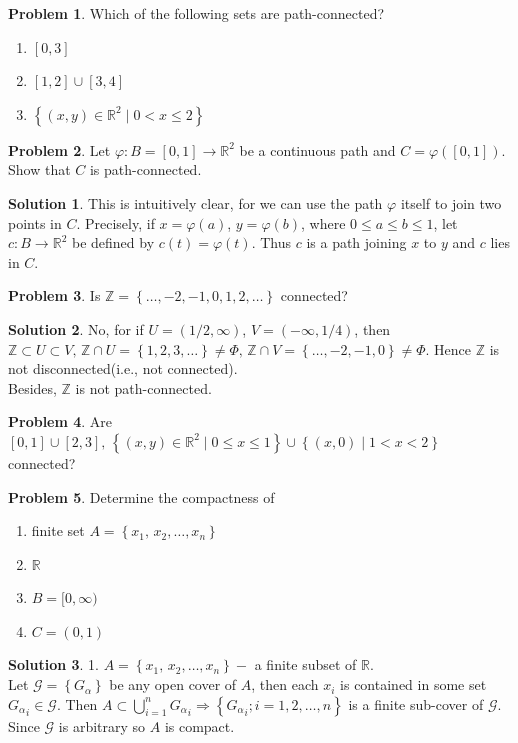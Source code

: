 \documentclass[12pt,oneside,a4paper]{book}
\newcommand{\R}{\mathds{R}}
\newcommand{\Z}{\mathds{Z}}
\newcommand{\xn}[2]{{#1}_1{#2}\,{#1}_2{#2}\dots{#2}{#1}_n}
\newcommand{\set}[1]{\left\{#1\right\}}
\theoremstyle{remark}
\theoremstyle{definition}
\newtheorem{prob}{Problem}[section]
\newtheorem*{soln}{Solution}
\begin{document}
\begin{prob}
    Which of the following sets are path-connected?
    \begin{enumerate}
        \item $ [0,3] $
        \item $ [1,2] \cup [3,4 ]$
        \item $ \set{(x,y)\in\R^2\mid0<x \leq2} $
    \end{enumerate}
\end{prob}
\begin{prob}
    Let $ \varphi: B=[0,1]\to \R^2 $ be a continuous path and $ C=\varphi([0,1]) $. Show that $ C $ is path-connected.
\end{prob}
\begin{soln}
    This is intuitively clear, for we can use the path $ \varphi $ itself to join two points in $ C $. Precisely, if $ x=\varphi(a) $, $ y=\varphi(b) $, where $ 0\leq a\leq b\leq 1 $, let $ c:B\to \R^2 $ be defined by $ c(t)=\varphi(t) $. Thus $ c $ is a path joining $ x $ to $ y $ and $ c $ lies in $ C $.
\end{soln}
\begin{prob}
    Is $ \Z=\set{\dots, -2, -1, 0 ,1,2,\dots} $ connected?
\end{prob}
\begin{soln}
    No, for if $ U=(1/2, \infty) $, $ V= (-\infty,1/4) $, then $ \Z\subset U\subset V,\, \Z\cap U=\set{1,2,3,\dots}\neq \Phi    ,\, \Z\cap V=\set{\dots,-2,-1,0}\neq \Phi $. Hence $ \Z $ is not disconnected(i.e., not connected).\\
    

    Besides, $ \Z $ is not path-connected.
\end{soln}
\begin{prob}
    Are $ [0,1]\cup [2,3],\, \set{(x,y)\in\R^2\mid 0\leq x\leq1}\cup \set{(x,0)\mid 1<x<2} $ connected?
\end{prob}
\begin{prob}
    Determine the compactness of
    \begin{enumerate}
        \item finite set $ A=\set{\xn{x}{,}} $
        \item $ \R $
        \item $ B=[0,\infty) $
        \item $ C=(0,1) $
    \end{enumerate}
\end{prob}
\begin{soln}
    1. $ A=\set{\xn{x}{,}} -$ a finite subset of $ \R $.\\
    Let $ \mathscr{G}=\set{G_\alpha}  $ be any open cover of $ A $, then each $ x_i $ is contained in some set $ {G_\alpha}_i \in \mathscr{G}$. Then $ A\subset \bigcup_{i=1}^n {G_\alpha}_i \Rightarrow \set{{G_\alpha}_i ; i=1,2,\dots,n}$ is a finite sub-cover of $ \mathscr{G} $. Since $ \mathscr{G} $ is arbitrary so $ A $ is compact.
\end{soln}
\end{document}

